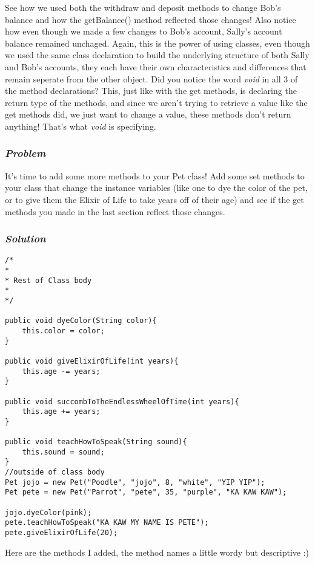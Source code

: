 \documentclass[14pt]{extreport}%
\begin{document}
See how we used both the withdraw and deposit methods to change Bob's balance and how the getBalance() method reflected those changes! Also notice how even though we made a few changes to Bob's account, Sally's account balance remained unchaged. Again, this is the power of using classes, even though we used the same class declaration to build the underlying structure of both Sally and Bob's accounts, they each have their own characteristics and differences that remain seperate from the other object. Did you notice the word \textit{void} in all 3 of the method declarations? This, just like with the get methods, is declaring the return type of the methods, and since we aren't trying to retrieve a value like the get methods did, we just want to change a value, these methods don't return anything! That's what \textit{void} is specifying. 

\subsubsection*{\textit{Problem}}
It's time to add some more methods to your Pet class! Add some set methods to your class that change the instance variables (like one to dye the color of the pet, or to give them the Elixir of Life to take years off of their age) and see if the get methods you made in the last section reflect those changes.

\subsubsection*{\textit{Solution}}
\begin{lstlisting}
/*
*
* Rest of Class body
*
*/

public void dyeColor(String color){
    this.color = color;
}

public void giveElixirOfLife(int years){
    this.age -= years;
}

public void succombToTheEndlessWheelOfTime(int years){
    this.age += years;
}

public void teachHowToSpeak(String sound){
    this.sound = sound;
}
//outside of class body
Pet jojo = new Pet("Poodle", "jojo", 8, "white", "YIP YIP");
Pet pete = new Pet("Parrot", "pete", 35, "purple", "KA KAW KAW");

jojo.dyeColor(pink);
pete.teachHowToSpeak("KA KAW MY NAME IS PETE");
pete.giveElixirOfLife(20);

\end{lstlisting}{}
Here are the methods I added, the method names a little wordy but descriptive :) 
\end{document}
